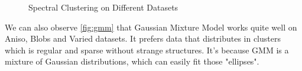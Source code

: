 \documentclass{article}
\begin{document}
\begin{figure}[htbp]
  \caption{Spectral Clustering on Different Datasets}
\end{figure}
\par
We can also observe \ref{fig:gmm} that Gaussian Mixture Model works quite well on Aniso, Blobs and Varied datasets. It prefers data that distributes in clusters which is regular and sparse without strange structures.
It's because GMM is a mixture of Gaussian distributions, which can easily fit those "ellipses".
\end{document}
